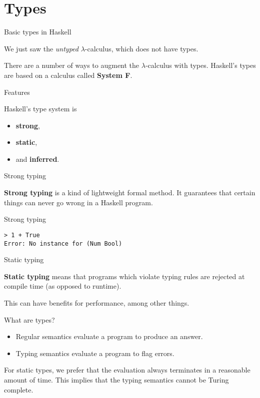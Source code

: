 
\section{Types}

%
\begin{frame}{Basic types in Haskell}

We just saw the \emph{untyped} $\lambda$-calculus, which does not have types.

There are a number of ways to augment the $\lambda$-calculus with types.
Haskell's types are based on a calculus called \textbf{System F}.

\end{frame}

%
\begin{frame}{Features}

Haskell's type system is 

\begin{itemize}
  \item \textbf{strong},
  \item \textbf{static},
  \item and \textbf{inferred}.
\end{itemize}

\end{frame}

%
\begin{frame}[fragile]{Strong typing}

\textbf{Strong typing} is a kind of lightweight formal method. It guarantees
that certain things can never go wrong in a Haskell program.

\begin{block}{Strong typing}
\begin{verbatim}
> 1 + True
Error: No instance for (Num Bool)
\end{verbatim}
\end{block}

\end{frame}

%
\begin{frame}[fragile]{Static typing}

\textbf{Static typing} means that programs which violate typing rules are
rejected at compile time (as opposed to runtime).

This can have benefits for performance, among other things.

\begin{block}{What are types?}
\begin{itemize}
  \item Regular semantics evaluate a program to produce an answer.
  \item Typing semantics evaluate a program to flag errors.
\end{itemize}

For static types, we prefer that the evaluation always terminates in a
reasonable amount of time. This implies that the typing semantics cannot be
Turing complete. 
\end{block}

\end{frame}

